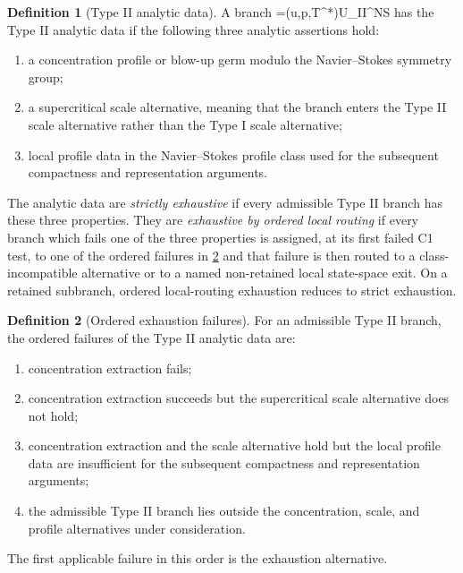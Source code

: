 \documentclass[11pt]{amsart}
\def\({}%
\def\){}%
\def\mathrm#1{#1}%
\theoremstyle{plain}
\theoremstyle{definition}
\newtheorem{definition}[definition]{Definition}
\theoremstyle{remark}
\begin{document}
\begin{definition}[Type II analytic data]
\label{def:c1-typeII-analytic-data}
A branch \(\omega=(u,p,T^*)\in\mathcal U_{\mathrm{II}}^{NS}\) has the Type II
analytic data if the following three analytic assertions hold:
\begin{enumerate}[label=\textup{(\roman*)}]
\item a concentration profile or blow-up germ modulo the Navier--Stokes
symmetry group;
\item a supercritical scale alternative, meaning that the branch enters the Type II
scale alternative rather than the Type I scale alternative;
\item local profile data in the Navier--Stokes profile class used
for the subsequent compactness and representation arguments.
\end{enumerate}
The analytic data are \emph{strictly exhaustive} if every admissible Type II
branch has these three properties.  They are \emph{exhaustive by ordered local
routing} if every branch which fails one of the three properties is assigned,
at its first failed C1 test, to one of the ordered failures in
\cref{def:c1-exhaustion-failures} and that failure is then routed to a
class-incompatible alternative or to a named non-retained local state-space
exit.  On a retained subbranch, ordered local-routing exhaustion reduces to
strict exhaustion.
\end{definition}

\begin{definition}[Ordered exhaustion failures]
\label{def:c1-exhaustion-failures}
For an admissible Type II branch, the ordered failures of the Type II analytic
data are:
\begin{enumerate}[label=\textup{(\roman*)}]
\item concentration extraction fails;
\item concentration extraction succeeds but the supercritical scale alternative
does not hold;
\item concentration extraction and the scale alternative hold but the local
profile data are insufficient for the subsequent compactness and representation
arguments;
\item the admissible Type II branch lies outside the concentration, scale, and
profile alternatives under consideration.
\end{enumerate}
The first applicable failure in this order is the exhaustion alternative.
\end{definition}
\end{document}
